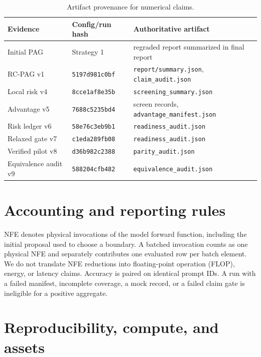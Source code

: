 \documentclass{article}
\newcommand{\pag}{PAG}
\newcommand{\rcpag}{RC-PAG}
\newcommand{\nfe}{NFE}
\begin{document}
\begin{table}[h]
  \caption{Artifact provenance for numerical claims.}
  \label{tab:artifacts}
  \centering
  \small
  \begin{tabular}{lll}
    \toprule
    Evidence & Config/run hash & Authoritative artifact \\
    \midrule
    Initial \pag{} & Strategy 1 & regraded report summarized in final report \\
    \rcpag{} v1 & \texttt{5197d981c0bf} & \texttt{report/summary.json}, \texttt{claim\_audit.json} \\
    Local risk v4 & \texttt{8cce1af8e35b} & \texttt{screening\_summary.json} \\
    Advantage v5 & \texttt{7688c5235bd4} & screen records, \texttt{advantage\_manifest.json} \\
    Risk ledger v6 & \texttt{58e76c3eb9b1} & \texttt{readiness\_audit.json} \\
    Relaxed gate v7 & \texttt{c1eda289fb08} & \texttt{readiness\_audit.json} \\
    Verified pilot v8 & \texttt{d36b982c2388} & \texttt{parity\_audit.json} \\
    Equivalence audit v9 & \texttt{588204cfb482} & \texttt{equivalence\_audit.json} \\
    \bottomrule
  \end{tabular}
\end{table}

\section{Accounting and reporting rules}

\nfe{} denotes physical invocations of the model forward function, including the initial proposal used to choose a boundary. A batched invocation counts as one physical \nfe{} and separately contributes one evaluated row per batch element. We do not translate \nfe{} reductions into floating-point operation (FLOP), energy, or latency claims. Accuracy is paired on identical prompt IDs. A run with a failed manifest, incomplete coverage, a mock record, or a failed claim gate is ineligible for a positive aggregate.

\section{Reproducibility, compute, and assets}
\end{document}
